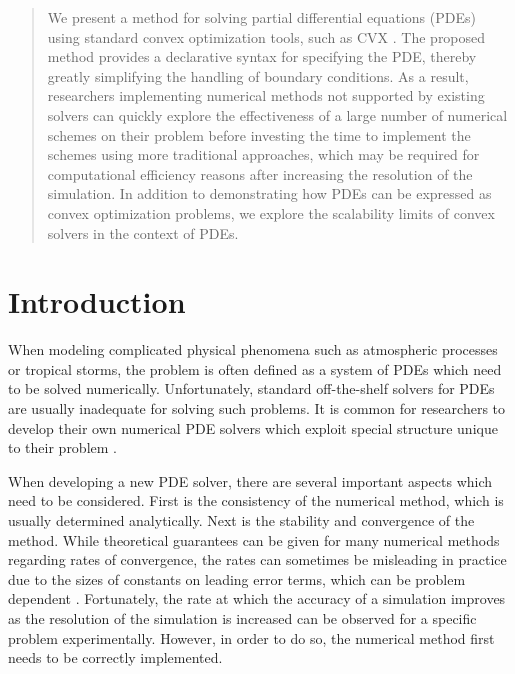 \documentclass[conference]{IEEEtran}
\begin{document}
\begin{abstract}
  We present a method for solving partial differential equations (PDEs) using standard convex optimization tools, such as CVX . The proposed method provides a declarative syntax for specifying the PDE, thereby greatly simplifying the handling of boundary conditions. As a result, researchers implementing numerical methods not supported by existing solvers can quickly explore the effectiveness of a large number of numerical schemes on their problem before investing the time to implement the schemes using more traditional approaches, which may be required for computational efficiency reasons after increasing the resolution of the simulation. In addition to demonstrating how PDEs can be expressed as convex optimization problems, we explore the scalability limits of convex solvers in the context of PDEs.
\end{abstract}


\section{Introduction}

When modeling complicated physical phenomena such as atmospheric processes or tropical storms, the problem is often defined as a system of PDEs which need to be solved numerically. Unfortunately, standard off-the-shelf solvers for PDEs are usually inadequate for solving such problems. It is common for researchers to develop their own numerical PDE solvers which exploit special structure unique to their problem .

When developing a new PDE solver, there are several important aspects which need to be considered. First is the consistency of the numerical method, which is usually determined analytically. Next is the stability and convergence of the method. While theoretical guarantees can be given for many numerical methods regarding rates of convergence, the rates can sometimes be misleading in practice due to the sizes of constants on leading error terms, which can be problem dependent . Fortunately, the rate at which the accuracy of a simulation improves as the resolution of the simulation is increased can be observed for a specific problem experimentally. However, in order to do so, the numerical method first needs to be correctly implemented.
\end{document}
